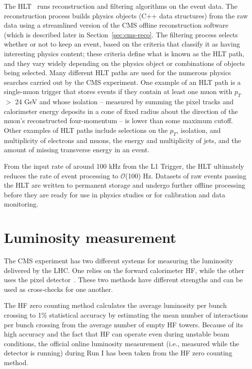The HLT~\cite{Cittolin:578006} runs reconstruction and filtering algorithms on the event data. The reconstruction process builds physics objects (C++ data structures) from the raw data using a streamlined version of the CMS offline reconstruction software (which is described later in Section~\ref{sec:cms-reco}. The filtering process selects whether or not to keep an event, based on the criteria that classify it as having interesting physics content; these criteria define what is known as the HLT path, and they vary widely depending on the physics object or combinations of objects being selected. Many different HLT paths are used for the numerous physics searches carried out by the CMS experiment. One example of an HLT path is a single-muon trigger that stores events if they contain at least one muon with $p_T$ $>$ 24 GeV and whose isolation -- measured by summing the pixel tracks and calorimeter energy deposits in a cone of fixed radius about the direction of the muon's reconstructed four-momentum -- is lower than some maximum cutoff. Other examples of HLT paths include selections on the $p_T$, isolation, and multiplicity of electrons and muons, the energy and multiplicity of jets, and the amount of missing transverse energy in an event.

From the input rate of around 100 kHz from the L1 Trigger, the HLT ultimately reduces the rate of event processing to $\mathcal{O}$(100) Hz. Datasets of raw events passing the HLT are written to permanent storage and undergo further offline processing before they are ready for use in physics studies or for calibration and data monitoring.

\section{Luminosity measurement\label{sec:cms-lumi}}

The CMS experiment has two different systems for measuring the luminosity delivered by the LHC. One relies on the forward calorimeter HF, while the other uses the pixel detector~\cite{CMS-PAS-LUM-13-001}. These two methods have different strengths and can be used as cross-checks for one another.

The HF zero counting method calculates the average luminosity per bunch crossing to 1\% statistical accuracy by estimating the mean number of interactions per bunch crossing from the average number of empty HF towers. Because of its high accuracy and the fact that HF can operate even during unstable beam conditions, the official online luminosity measurement (i.e., measured while the detector is running) during Run I has been taken from the HF zero counting method.

